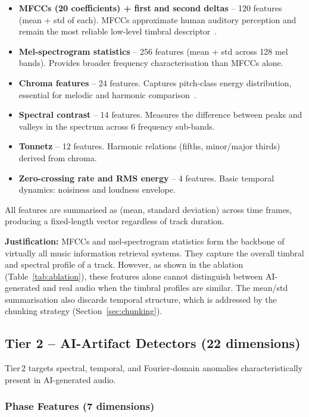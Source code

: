 \documentclass[11pt,a4paper]{article}
\begin{document}
\begin{itemize}[nosep]
  \item \textbf{MFCCs (20 coefficients) + first and second deltas} -- 120 features (mean + std of each). MFCCs approximate human auditory perception and remain the most reliable low-level timbral descriptor~\cite{B1}.
  \item \textbf{Mel-spectrogram statistics} -- 256 features (mean + std across 128 mel bands). Provides broader frequency characterisation than MFCCs alone.
  \item \textbf{Chroma features} -- 24 features. Captures pitch-class energy distribution, essential for melodic and harmonic comparison~\cite{B2}.
  \item \textbf{Spectral contrast} -- 14 features. Measures the difference between peaks and valleys in the spectrum across 6 frequency sub-bands.
  \item \textbf{Tonnetz} -- 12 features. Harmonic relations (fifths, minor/major thirds) derived from chroma.
  \item \textbf{Zero-crossing rate and RMS energy} -- 4 features. Basic temporal dynamics: noisiness and loudness envelope.
\end{itemize}

All features are summarised as (mean, standard deviation) across time frames, producing a fixed-length vector regardless of track duration.

\textbf{Justification:} MFCCs and mel-spectrogram statistics form the backbone of virtually all music information retrieval systems. They capture the overall timbral and spectral profile of a track. However, as shown in the ablation (Table~\ref{tab:ablation}), these features alone cannot distinguish between AI-generated and real audio when the timbral profiles are similar. The mean/std summarisation also discards temporal structure, which is addressed by the chunking strategy (Section~\ref{sec:chunking}).

\subsection{Tier 2 -- AI-Artifact Detectors (22 dimensions)}

Tier\,2 targets spectral, temporal, and Fourier-domain anomalies characteristically present in AI-generated audio.

\subsubsection{Phase Features (7 dimensions)}
\end{document}
